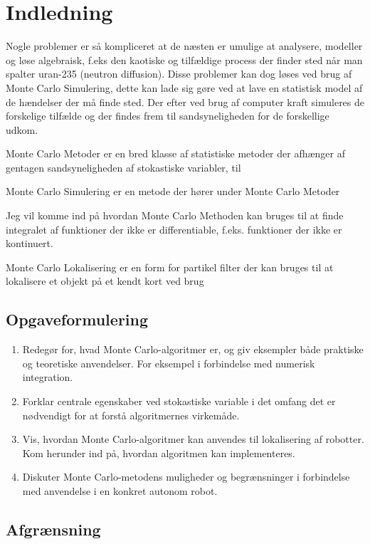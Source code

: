 \documentclass[../../SRP.tex]{subfiles}
\begin{document}
\chapter{Indledning}
Nogle problemer er så kompliceret at de næsten er umulige at analysere, modeller og løse algebraisk, f.eks den kaotiske og tilfældige process der finder sted når man spalter uran-235 (neutron diffusion).
 Disse problemer kan dog løses ved brug af Monte Carlo Simulering, dette kan lade sig gøre ved at lave en statistisk model af de hændelser der må finde sted. Der efter ved brug af computer kraft simuleres de forskelige tilfælde og der findes frem til sandsyneligheden for de forskellige udkom.

Monte Carlo Metoder er en bred klasse af statistiske metoder der afhænger af gentagen sandsyneligheden af stokastiske variabler, til

Monte Carlo Simulering er en metode der hører under Monte Carlo Metoder

Jeg vil komme ind på hvordan Monte Carlo Methoden kan bruges til at finde integralet af funktioner der ikke er differentiable, f.eks. funktioner der ikke er kontinuert.

Monte Carlo Lokalisering er en form for partikel filter der kan bruges til at lokalisere et objekt på et kendt kort ved brug 


\section{Opgaveformulering}
  \begin{enumerate}[label=(\Roman*)]
  \item Redegør for, hvad Monte Carlo-algoritmer er, og giv eksempler både praktiske og teoretiske anvendelser. For eksempel i forbindelse med numerisk integration.

  \item Forklar centrale egenskaber ved stokastiske variable i det omfang det er nødvendigt for at forstå algoritmernes virkemåde.

  \item Vis, hvordan Monte Carlo-algoritmer kan anvendes til lokalisering af robotter. Kom herunder ind på, hvordan algoritmen kan implementeres.

  \item Diskuter Monte Carlo-metodens muligheder og begrænsninger i forbindelse med anvendelse i en konkret autonom robot.
  \end{enumerate}

\section{Afgrænsning}
\end{document}
